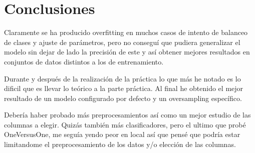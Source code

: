 \section{Conclusiones}

Claramente se ha producido overfitting en muchos casos de intento de balanceo de clases y ajuste de parámetros, pero no conseguí que pudiera generalizar el modelo sin dejar de lado la precisión de este y así obtener mejores resultados en conjuntos de datos distintos a los de entrenamiento.

Durante y después de la realización de la práctica lo que más he notado es lo dificil que es llevar lo teórico a la parte práctica. Al final he obtenido el mejor resultado de un modelo configurado por defecto y un oversampling específico.

Debería haber probado más preprocesamientos así como un mejor estudio de las columnas a elegir. Quizás también más clasificadores, pero el ultimo que probé OneVersusOne, me seguía yendo peor en local así que pensé que podría estar limitandome el preprocesamiento de los datos y/o elección de las columnas.
